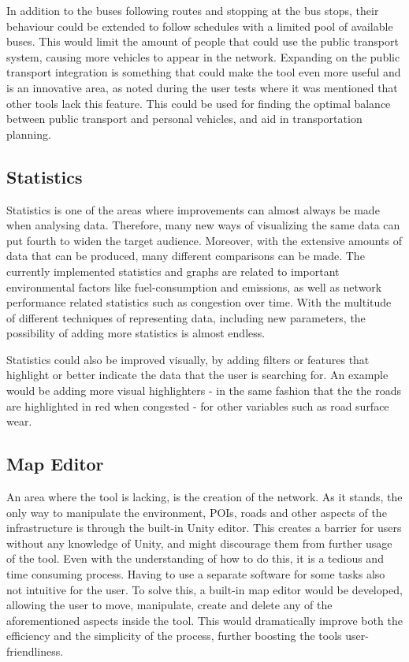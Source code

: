         In addition to the buses following routes and stopping at the bus stops, their behaviour could be extended to follow schedules with a limited pool of available buses. This would limit the amount of people that could use the public transport system, causing more vehicles to appear in the network. Expanding on the public transport integration is something that could make the tool even more useful and is an innovative area, as noted during the user tests where it was mentioned that other tools lack this feature. This could be used for finding the optimal balance between public transport and personal vehicles, and aid in transportation planning.

    \subsection{Statistics}
        Statistics is one of the areas where improvements can almost always be made when analysing data. Therefore, many new ways of visualizing the same data can put fourth to widen the target audience. Moreover, with the extensive amounts of data that can be produced, many different comparisons can be made. The currently implemented statistics and graphs are related to important environmental factors like fuel-consumption and emissions, as well as network performance related statistics such as congestion over time. With the multitude of different techniques of representing data, including new parameters, the possibility of adding more statistics is almost endless.

        Statistics could also be improved visually, by adding filters or features that highlight or better indicate the data that the user is searching for. An example would be adding more visual highlighters - in the same fashion that the the roads are highlighted in red when congested - for other variables such as road surface wear.

    \subsection{Map Editor}
        An area where the tool is lacking, is the creation of the network. As it stands, the only way to manipulate the environment, POIs, roads and other aspects of the infrastructure is through the built-in Unity editor. This creates a barrier for users without any knowledge of Unity, and might discourage them from further usage of the tool. Even with the understanding of how to do this, it is a tedious and time consuming process. Having to use a separate software for some tasks also not intuitive for the user. To solve this, a built-in map editor would be developed, allowing the user to move, manipulate, create and delete any of the aforementioned aspects inside the tool. This would dramatically improve both the efficiency and the simplicity of the process, further boosting the tools user-friendliness.
        